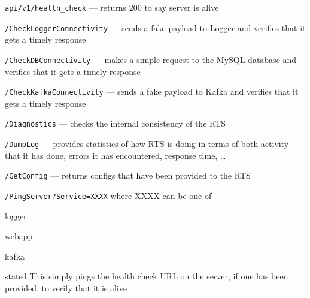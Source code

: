 \documentclass[letterpaper]{article}
\begin{document}
\be
\item {\tt api/v1/health\_check} --- returns 200 to say server is alive
\item {\tt /CheckLoggerConnectivity} --- sends a fake payload to Logger and
  verifies that it gets a timely response
\item {\tt /CheckDBConnectivity} --- makes a simple request to the MySQL
  database and verifies that it gets a timely response
\item {\tt /CheckKafkaConnectivity} --- sends a fake payload to Kafka and
  verifies that it gets a timely response
\item {\tt /Diagnostics} --- checks the internal consistency of the RTS
\item {\tt /DumpLog} --- provides statistics of how RTS is doing in terms of
  both activity that it has done, errors it has encountered, response time,
  \ldots
\item {\tt /GetConfig} --- returns configs that have been provided to the
  RTS
\item {\tt /PingServer?Service=XXXX} where XXXX can be one of 
  \be
\item logger
\item webapp
\item kafka 
\item statsd 
  \ee
  This simply pings the health check URL on the server, if one has been
  provided, to verify that it is alive
  \ee
\end{document}
